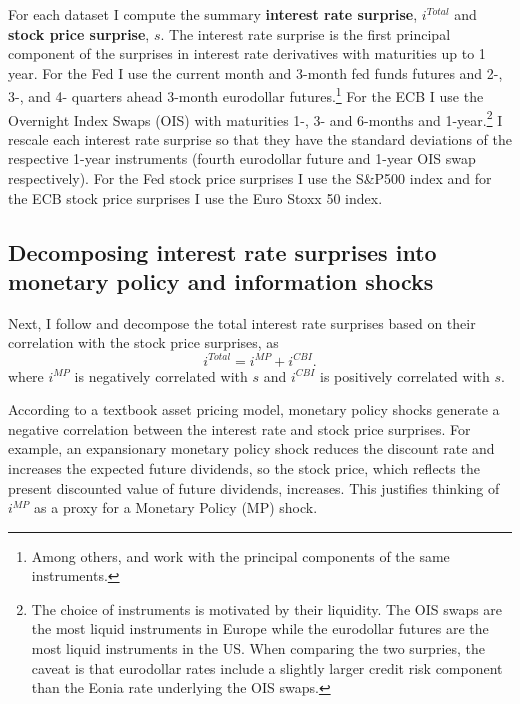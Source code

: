 \documentclass[a4paper,12pt]{article}
\begin{document}
For each dataset I compute the summary \textbf{interest rate surprise}, $i^{Total}$ and \textbf{stock price surprise}, $s$.
The interest rate surprise is the first principal component of the surprises in interest rate derivatives with maturities up to 1 year. 
For the Fed I use the current month and 3-month fed funds futures and 2-, 3-, and 4- quarters ahead 3-month eurodollar futures.\footnote{Among others, \cite{Gurkaynak_Sack_Swanson_2005a} and \cite{Nakamura_Steinsson_2018} work with the principal components of the same instruments.} 
For the ECB I use the Overnight Index Swaps (OIS) with maturities 1-, 3- and 6-months and 1-year.\footnote{The choice of instruments is motivated by their liquidity. The OIS swaps are the most liquid instruments in Europe while the eurodollar futures are the most liquid instruments in the US. When comparing the two surpries, the caveat is that eurodollar rates include a slightly larger credit risk component than the Eonia rate underlying the OIS swaps.}
I rescale each interest rate surprise so that they have the standard deviations of the respective 1-year instruments (fourth eurodollar future and 1-year OIS swap respectively).
For the Fed stock price surprises I use the S\&P500 index and for the ECB stock price surprises I use the Euro Stoxx 50 index.


\subsection{Decomposing interest rate surprises into monetary policy and information shocks}

Next, I follow  \cite{Jarocinski_Karadi_2020} and decompose the total interest rate surprises
based on their correlation with the stock price surprises, as
\begin{equation}
i^{Total} = i^{MP}+i^{CBI}.\label{eq: decomposition}
\end{equation}
where $i^{MP}$ is negatively correlated with $s$ and $i^{CBI}$ is positively correlated with $s$.

According to a textbook asset pricing model, monetary policy shocks generate a negative correlation between the interest rate and stock price surprises. For example, an expansionary monetary policy shock reduces the discount rate and increases the expected future dividends, so the stock price, which reflects the present discounted value of future dividends, increases. This justifies thinking of $i^{MP}$ as a proxy for a Monetary Policy (MP) shock.
\end{document}
